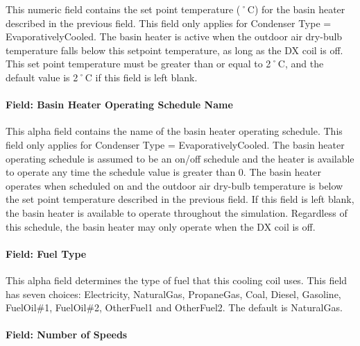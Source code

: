 This numeric field contains the set point temperature (˚C) for the basin heater described in the previous field. This field only applies for Condenser Type = EvaporativelyCooled. The basin heater is active when the outdoor air dry-bulb temperature falls below this setpoint temperature, as long as the DX coil is off. This set point temperature must be greater than or equal to 2˚C, and the default value is 2˚C if this field is left blank.

\paragraph{Field: Basin Heater Operating Schedule Name}\label{field-basin-heater-operating-schedule-name-3-000}

This alpha field contains the name of the basin heater operating schedule. This field only applies for Condenser Type = EvaporativelyCooled. The basin heater operating schedule is assumed to be an on/off schedule and the heater is available to operate any time the schedule value is greater than 0. The basin heater operates when scheduled on and the outdoor air dry-bulb temperature is below the set point temperature described in the previous field. If this field is left blank, the basin heater is available to operate throughout the simulation. Regardless of this schedule, the basin heater may only operate when the DX coil is off.

\paragraph{Field: Fuel Type}\label{field-fuel-type-000}

This alpha field determines the type of fuel that this cooling coil uses. This field has seven choices: Electricity, NaturalGas, PropaneGas, Coal, Diesel, Gasoline, FuelOil\#1, FuelOil\#2, OtherFuel1 and OtherFuel2. The default is NaturalGas.

\paragraph{Field: Number of Speeds}\label{field-number-of-speeds}

